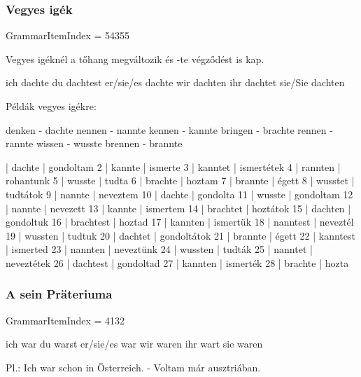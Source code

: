 \documentclass{article}
\newenvironment{desc}{\verbatim}{\endverbatim}
\newenvironment{exmp}{\verbatim}{\endverbatim}
\begin{document}
\subsubsection{Vegyes igék}

GrammarItemIndex = 54355

\begin{desc}
Vegyes igéknél a tőhang megváltozik és -te végződést is kap.

ich dachte
du dachtest
er/sie/es dachte
wir dachten
ihr dachtet
sie/Sie dachten

Példák vegyes igékre:

denken - dachte
nennen - nannte
kennen - kannte
bringen - brachte
rennen - rannte
wissen - wusste
brennen - brannte

\end{desc}

\begin{exmp}
1 | dachte | gondoltam
2 | kannte | ismerte
3 | kanntet | ismertétek
4 | rannten | rohantunk
5 | wusste | tudta
6 | brachte | hoztam
7 | brannte | égett
8 | wusstet | tudtátok
9 | nannte | neveztem
10 | dachte | gondolta
11 | wusste | gondoltam
12 | nannte | nevezett
13 | kannte | ismertem
14 | brachtet | hoztátok
15 | dachten | gondoltuk
16 | brachtest | hoztad
17 | kannten | ismertük
18 | nanntest | neveztél
19 | wussten | tudtuk
20 | dachtet | gondoltátok
21 | brannte | égett
22 | kanntest | ismerted
23 | nannten | neveztünk
24 | wussten | tudták
25 | nanntet | neveztétek
26 | dachtest | gondoltad
27 | kannten | ismerték
28 | brachte | hozta
\end{exmp}

\subsubsection{A sein Präteriuma}

GrammarItemIndex = 4132

\begin{desc}
ich war
du warst
er/sie/es war
wir waren
ihr wart
sie waren

Pl.: Ich war schon in Österreich. - Voltam már ausztriában.
\end{desc}
\end{document}
